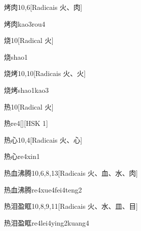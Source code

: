 \begin{entry}{烤肉}{10,6}[Radicais ⽕、⾁]
  \begin{phonetics}{烤肉}{kao3rou4}
  \end{phonetics}
\end{entry}

\begin{entry}{烧}{10}[Radical ⽕]
  \begin{phonetics}{烧}{shao1}
  \end{phonetics}
\end{entry}

\begin{entry}{烧烤}{10,10}[Radicais ⽕、⽕]
  \begin{phonetics}{烧烤}{shao1kao3}
  \end{phonetics}
\end{entry}

\begin{entry}{热}{10}[Radical ⽕]
  \begin{phonetics}{热}{re4}[][HSK 1]
  \end{phonetics}
\end{entry}

\begin{entry}{热心}{10,4}[Radicais ⽕、⼼]
  \begin{phonetics}{热心}{re4xin1}
  \end{phonetics}
\end{entry}

\begin{entry}{热血沸腾}{10,6,8,13}[Radicais ⽕、⾎、⽔、⾁]
  \begin{phonetics}{热血沸腾}{re4xue4fei4teng2}
  \end{phonetics}
\end{entry}

\begin{entry}{热泪盈眶}{10,8,9,11}[Radicais ⽕、⽔、⽫、⽬]
  \begin{phonetics}{热泪盈眶}{re4lei4ying2kuang4}
  \end{phonetics}
\end{entry}

